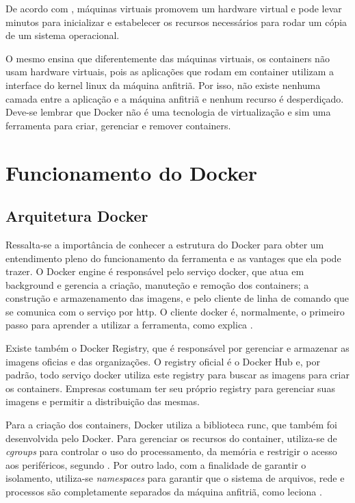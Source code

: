 \documentclass[
	12pt,				%
	openright,			%
	oneside,			%
	a4paper,			%
	chapter=TITLE,		%
	section=TITLE,		%
	english,			%
	french,				%
	spanish,			%
	brazil				%
	]{abntex2}
\begin{document}
De acordo com , máquinas virtuais promovem um hardware virtual e pode levar minutos para inicializar e estabelecer os recursos necessários para rodar um cópia de um sistema operacional.

O mesmo  ensina que diferentemente das máquinas virtuais, os containers não usam hardware virtuais, pois as aplicações que rodam em container utilizam a interface do kernel linux da máquina anfitriã. Por isso, não existe nenhuma camada entre a aplicação e a máquina anfitriã e nenhum recurso é desperdiçado. Deve-se lembrar que Docker não é uma tecnologia de virtualização e sim uma ferramenta para criar, gerenciar e remover containers.

\section{Funcionamento do Docker}

\subsection{Arquitetura Docker}

Ressalta-se a importância de conhecer a estrutura do Docker para obter um entendimento pleno do funcionamento da ferramenta e as vantages que ela pode trazer. O Docker engine é responsável pelo serviço docker, que atua em background e gerencia a criação, manuteção e remoção dos containers; a construção e armazenamento das imagens, e pelo cliente de linha de comando que se comunica com o serviço por http. O cliente docker é, normalmente, o primeiro passo para aprender a utilizar a ferramenta, como explica .

Existe também o Docker Registry, que é responsável por gerenciar e armazenar as imagens oficias e das organizações. O registry oficial é o Docker Hub e, por padrão, todo serviço docker utiliza este registry para buscar as imagens para criar os containers. Empresas costumam ter seu próprio registry para gerenciar suas imagens e permitir a distribuição das mesmas.

Para a criação dos containers, Docker utiliza a biblioteca runc, que também foi desenvolvida pelo Docker. Para gerenciar os recursos do container, utiliza-se de \textit{cgroups} para controlar o uso do processamento, da memória e restrigir o acesso aos periféricos, segundo . Por outro lado, com a finalidade de garantir o isolamento, utiliza-se \textit{namespaces} para garantir que o sistema de arquivos, rede e processos são completamente separados da máquina anfitriã, como leciona .
\end{document}
